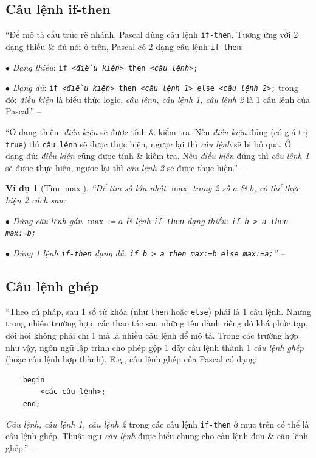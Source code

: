 \documentclass[oneside]{book}
\numberwithin{equation}{section}
\newtheorem{vidu}{Ví dụ}[section]
\begin{document}
\subsection{Câu lệnh if-then}
``Để mô tả cấu trúc rẽ nhánh, Pascal dùng câu lệnh \texttt{if-then}. Tương ứng với 2 dạng thiếu \& đủ nói ở trên, Pascal có 2 dạng câu lệnh \texttt{if-then}:
\begin{enumerate*}
	\item[$\bullet$] \textit{Dạng thiếu}: \texttt{if <\textit{điều kiện}> then <\textit{câu lệnh}>;}
	\item[$\bullet$] \textit{Dạng đủ}: \texttt{if <\textit{điều kiện}> then <\textit{câu lệnh 1}> else <\textit{câu lệnh 2}>;} trong đó: \textit{điều kiện} là biểu thức logic, \textit{câu lệnh, câu lệnh 1, câu lệnh 2} là 1 câu lệnh của Pascal.'' -- \cite[p. 39]{SGK_Tin_Hoc_11}
\end{enumerate*}
``Ở dạng thiếu: \textit{điều kiện} sẽ được tính \& kiểm tra. Nếu \textit{điều kiện} đúng (có giá trị \texttt{true}) thì \texttt{câu lệnh} sẽ được thực hiện, ngược lại thì \textit{câu lệnh} sẽ bị bỏ qua. Ở dạng đủ: \textit{điều kiện} cũng được tính \& kiểm tra. Nếu \textit{điều kiện} đúng thì \textit{câu lệnh 1} sẽ được thực hiện, ngược lại thì \textit{câu lệnh 2} sẽ được thực hiện.'' -- \cite[p. 40]{SGK_Tin_Hoc_11}

\begin{vidu}[Tìm $\max$]
	``Để tìm số lớn nhất $\max$ trong 2 số $a$ \& $b$, có thể thực hiện 2 cách sau:
	\begin{enumerate*}
		\item[$\bullet$] Dùng câu lệnh gán $\max\coloneqq a$ \& lệnh \texttt{if-then} dạng thiếu: \texttt{if b > a then max:=b;}
		\item[$\bullet$] Dùng 1 lệnh \texttt{if-then} dạng đủ: \texttt{if b > a then max:=b else max:=a;}'' -- \cite[p. 40]{SGK_Tin_Hoc_11}
	\end{enumerate*}
\end{vidu}

\subsection{Câu lệnh ghép}
``Theo cú pháp, sau 1 số từ khóa (như \texttt{then} hoặc \texttt{else}) phải là 1 câu lệnh. Nhưng trong nhiều trường hợp, các thao tác sau những tên dành riêng đó khá phức tạp, đòi hỏi không phải chỉ 1 mà là nhiều câu lệnh để mô tả. Trong các trường hợp như vậy, ngôn ngữ lập trình cho phép gộp 1 dãy câu lệnh thành 1 \textit{câu lệnh ghép} (hoặc câu lệnh hợp thành). E.g., câu lệnh ghép của Pascal có dạng:
\begin{verbatim}
	begin
	    <các câu lệnh>;
	end;
\end{verbatim}
\textit{Câu lệnh, câu lệnh 1, câu lệnh 2} trong các câu lệnh \texttt{if-then} ở mục trên có thể là câu lệnh ghép. Thuật ngữ \textit{câu lệnh} được hiểu chung cho câu lệnh đơn \& câu lệnh ghép.'' -- \cite[p. 40]{SGK_Tin_Hoc_11}
\end{document}
